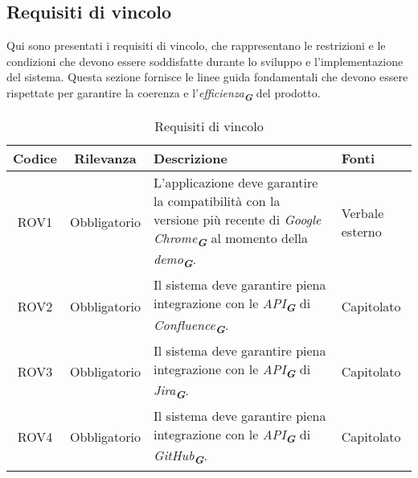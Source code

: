 \subsection{Requisiti di vincolo}
\label{sec:req_vincolo}
Qui sono presentati i requisiti di vincolo, che rappresentano le restrizioni e le condizioni
che devono essere soddisfatte durante lo sviluppo e l'implementazione del sistema. Questa
sezione fornisce le linee guida fondamentali che devono essere rispettate per garantire la
coerenza e l'\emph{efficienza}\textsubscript{\textit{\textbf{G}}} del prodotto.
\begin{table}[h!]
    \centering
    \renewcommand{\arraystretch}{1.6} %
    \begin{tabularx}{\textwidth}{|>{\centering\arraybackslash}c|>{\centering\arraybackslash}c|>{\centering\arraybackslash}X|>{\centering\arraybackslash}p{3cm}|} \hline
    \rowcolor[HTML]{FFD700} 
    \textbf{Codice} & \textbf{Rilevanza} & \textbf{Descrizione} & \textbf{Fonti} \\ \hline
	ROV1 & Obbligatorio & L'applicazione deve garantire la compatibilità con la versione più recente di \emph{Google Chrome}\textsubscript{\textit{\textbf{G}}} al momento della \emph{demo}\textsubscript{\textit{\textbf{G}}}. & Verbale esterno \\ \hline
    ROV2 & Obbligatorio & Il sistema deve garantire piena integrazione con le \emph{API}\textsubscript{\textit{\textbf{G}}} di \emph{Confluence}\textsubscript{\textit{\textbf{G}}}. & Capitolato \\ \hline
    ROV3 & Obbligatorio & Il sistema deve garantire piena integrazione con le \emph{API}\textsubscript{\textit{\textbf{G}}} di \emph{Jira}\textsubscript{\textit{\textbf{G}}}. & Capitolato \\ \hline
    ROV4 & Obbligatorio & Il sistema deve garantire piena integrazione con le \emph{API}\textsubscript{\textit{\textbf{G}}} di \emph{GitHub}\textsubscript{\textit{\textbf{G}}}. & Capitolato \\ \hline
    \end{tabularx}
    \caption{Requisiti di vincolo}
    \label{tab:Requisiti_di_vincolo}
\end{table}

